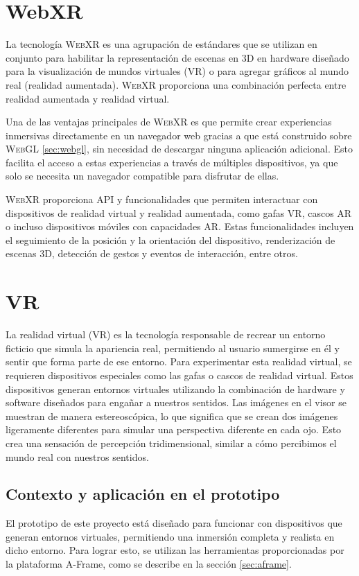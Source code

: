 \documentclass[a4paper, 11pt]{book}
\begin{document}
\section{WebXR}
La tecnología \textsc{WebXR} es una agrupación de estándares que se utilizan en conjunto para habilitar la representación de escenas en 3D en \gls{hardware} diseñado para la visualización de mundos virtuales (VR) o para agregar gráficos al mundo real (realidad aumentada). \textsc{WebXR} proporciona una combinación perfecta entre realidad aumentada y realidad virtual.

Una de las ventajas principales de \textsc{WebXR} es que permite crear experiencias inmersivas directamente en un navegador web gracias a que está construido sobre \textsc{WebGL} \ref{sec:webgl}, sin necesidad de descargar ninguna aplicación adicional. Esto facilita el acceso a estas experiencias a través de múltiples dispositivos, ya que solo se necesita un navegador compatible para disfrutar de ellas.

\textsc{WebXR} proporciona \textsc{\gls{API}} y funcionalidades que permiten interactuar con dispositivos de realidad virtual y realidad aumentada, como gafas \textsc{VR}, cascos \textsc{AR} o incluso dispositivos móviles con capacidades \textsc{AR}. Estas funcionalidades incluyen el seguimiento de la posición y la orientación del dispositivo, renderización de escenas \textsc{3D}, detección de gestos y eventos de interacción, entre otros.

\section{VR}
La realidad virtual (\textsc{VR}) es la tecnología responsable de recrear un entorno ficticio que simula la apariencia real, permitiendo al usuario sumergirse en él y sentir que forma parte de ese entorno. Para experimentar esta realidad virtual, se requieren dispositivos especiales como las gafas o cascos de realidad virtual. Estos dispositivos generan entornos virtuales utilizando la combinación de \gls{hardware} y software diseñados para engañar a nuestros sentidos. Las imágenes en el visor se muestran de manera estereoscópica, lo que significa que se crean dos imágenes ligeramente diferentes para simular una perspectiva diferente en cada ojo. Esto crea una sensación de percepción tridimensional, similar a cómo percibimos el mundo real con nuestros sentidos.
\subsection{Contexto y aplicación en el prototipo}
El prototipo de este proyecto está diseñado para funcionar con dispositivos que generan entornos virtuales, permitiendo una inmersión completa y realista en dicho entorno. Para lograr esto, se utilizan las herramientas proporcionadas por la plataforma A-Frame, como se describe en la sección \ref{sec:aframe}. 
\end{document}
